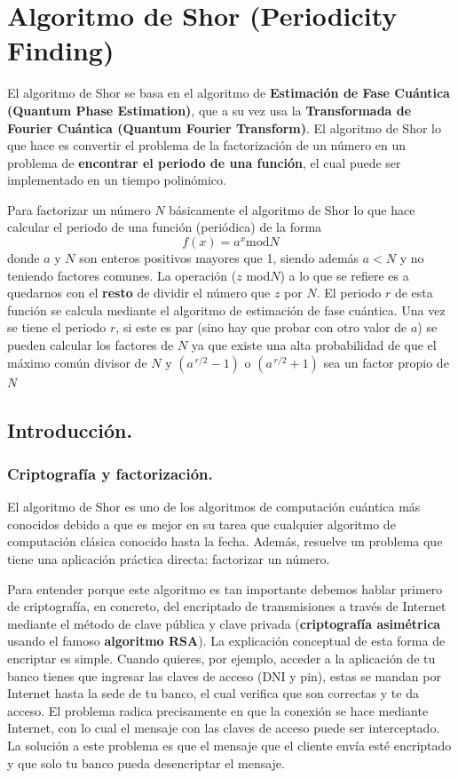 \documentclass[a4paper,11pt]{book} %
\numberwithin{equation}{chapter}
\begin{document}
\chapter{Algoritmo de Shor (Periodicity Finding)} \label{sec_chapter_Shor}

El algoritmo de Shor se basa en el algoritmo de \textbf{Estimación de Fase Cuántica (Quantum Phase Estimation)}, que a su vez usa la \textbf{Transformada de Fourier Cuántica (Quantum Fourier Transform)}. El algoritmo de Shor lo que hace es convertir el problema de la factorización  de un número en un problema de \textbf{encontrar el periodo de una función}, el cual puede ser implementado en un tiempo polinómico. 

Para factorizar un número $N$ básicamente el algoritmo de Shor lo que hace calcular el periodo de una función (periódica) de la forma
\begin{equation*}
f(x) = a^x \text{mod} N
\end{equation*}
donde $a$ y $N$ son enteros positivos mayores que 1, siendo además $a < N$ y no teniendo factores comunes. La operación ($z$ mod$N$) a lo que se refiere es a quedarnos con el \textbf{resto} de dividir el número que $z$ por $N$. El periodo $r$ de esta función se calcula mediante el algoritmo de estimación de fase cuántica. Una vez se tiene el periodo $r$, si este es par (sino hay que probar con otro valor de $a$) se pueden calcular los factores de $N$ ya que existe una alta probabilidad de que el máximo común divisor de $N$ y $(a^{\,r/2}-1)$ o $(a^{\,r/2}+1)$ sea un factor propio de $N$




\section{Introducción.}
			
\subsection{Criptografía y factorización.}

El algoritmo de Shor es uno de los algoritmos de computación cuántica más conocidos debido a que es mejor en su tarea que cualquier algoritmo de computación clásica conocido hasta la fecha. Además, resuelve un problema que tiene una aplicación práctica directa: factorizar un número.

Para entender porque este algoritmo es tan importante debemos hablar primero de criptografía, en concreto, del encriptado de transmisiones a través de Internet mediante el método de clave pública y clave privada (\textbf{criptografía asimétrica} usando el famoso \textbf{algoritmo RSA}). La explicación conceptual de esta forma de encriptar es simple. Cuando quieres, por ejemplo, acceder a la aplicación de tu banco tienes que ingresar las claves de acceso (DNI y pin), estas se mandan por Internet hasta la sede de tu banco, el cual verifica que son correctas y te da acceso. El problema radica precisamente en que la conexión se hace mediante Internet, con lo cual el mensaje con las claves de acceso puede ser interceptado. La solución a este problema es que el mensaje que el cliente envía esté encriptado y que solo tu banco pueda desencriptar el mensaje. 
\end{document}
